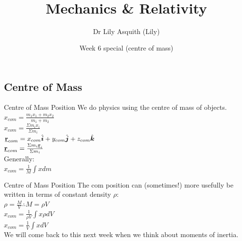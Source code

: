


% 
\title[ Mechanics \& Relativity]{Mechanics \& Relativity}
\author[Dr Lily Asquith (Lily)]{ Dr Lily Asquith (Lily)}
\date[Week 6 special (centre of mass)]{Week 6 special (centre of mass)}





\begin{frame}
\titlepage
\end{frame} 


 \subsection{Centre of Mass}

\begin{frame}{Centre of Mass Position}
\small
We do physics using the centre of mass of objects.\\[2ex]

$x_{com} = \frac{m_1 x_1 + m_2 x_2}{m_1 + m_2}$\\[2ex]

$x_{com} = \frac{\Sigma m_i x_i}{\Sigma m_i}$\\[2ex]

$\underline{\mathbf{r}}_{com} =x_{com} \hat{\boldsymbol{i}} + y_{com} \hat{\boldsymbol{j}}  + z_{com} \hat{\boldsymbol{k}} $\\[2ex]
$\underline{\mathbf{r}}_{com} = \frac{\Sigma m_i \underline{\mathbf{r}}_i}{\Sigma m_i}$\\[2ex]


Generally:\\[2ex]
$x_{com} = \frac{1}{M} \int x dm$\\[2ex]






\vspace{10cm}
\end{frame}


\begin{frame}{Centre of Mass Position}
\small
The com position can (sometimes!) more usefully be written in terms of constant density $\rho$:\\[2ex]

$\rho = \frac{M}{V} \therefore M = \rho V$ \\[2ex]
$x_{com} = \frac{1}{\rho V} \int x \rho dV$\\[2ex]
$x_{com} = \frac{1}{V} \int x dV$\\[2ex]

We will come back to this next week when we think about moments of inertia.
\end{frame}

